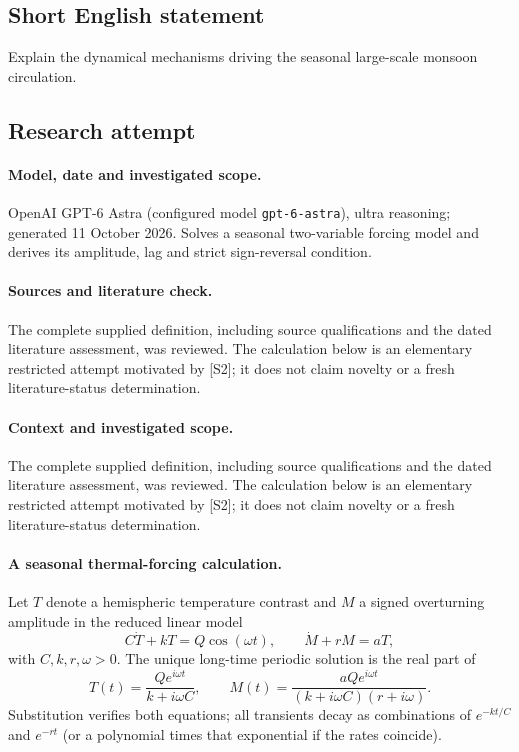 \documentclass[11pt]{article}
\begin{document}
\subsection{Short English statement}
Explain the dynamical mechanisms driving the seasonal large-scale monsoon circulation.
\subsection{Research attempt}
\paragraph{Model, date and investigated scope.}
OpenAI GPT-6 Astra (configured model \texttt{gpt-6-astra}), ultra reasoning; generated 11 October 2026. Solves a seasonal two-variable forcing model and derives its amplitude, lag and strict sign-reversal condition.

\paragraph{Sources and literature check.}
The complete supplied definition, including source qualifications and the dated literature assessment, was reviewed. The calculation below is an elementary restricted attempt motivated by [S2]; it does not claim novelty or a fresh literature-status determination.

\paragraph{Context and investigated scope.} The complete supplied definition, including source qualifications and the dated literature assessment, was reviewed. The calculation below is an elementary restricted attempt motivated by [S2]; it does not claim novelty or a fresh literature-status determination.

\paragraph{A seasonal thermal-forcing calculation.} Let $T$ denote a hemispheric temperature contrast and $M$ a signed overturning amplitude in the reduced linear model
\[
 C\dot T+kT=Q\cos(\omega t),\qquad \dot M+rM=aT,
\]
with $C,k,r,\omega>0$. The unique long-time periodic solution is the real part of
\[
 T(t)=\frac{Qe^{i\omega t}}{k+i\omega C},\qquad
 M(t)=\frac{aQe^{i\omega t}}{(k+i\omega C)(r+i\omega)}.
\]
Substitution verifies both equations; all transients decay as combinations of $e^{-kt/C}$ and $e^{-rt}$ (or a polynomial times that exponential if the rates coincide).
\end{document}
